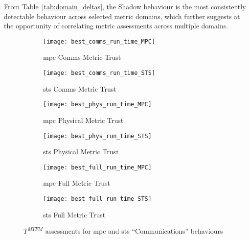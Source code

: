 From Table~\ref{tab:domain_deltas}, the Shadow behaviour is the most consistently detectable behaviour across selected metric domains, which further suggests at the opportunity of correlating metric assessments across multiple domains.




\begin{figure}
	\begin{subfigure}[b]{0.5\textwidth}
	  \centering
	  \texttt{[image: best\_comms\_run\_time\_MPC]}
	  \caption{\gls{mpc} Comms Metric Trust }
	  \label{fig:comms_time_mpc}
	\end{subfigure}
	\begin{subfigure}[b]{0.5\textwidth}
		\centering
		\texttt{[image: best\_comms\_run\_time\_STS]}
		\caption{\gls{sts} Comms Metric Trust }
		\label{fig:comms_time_sts}
	\end{subfigure}
	
	\begin{subfigure}[b]{0.5\textwidth}
	  \centering
	  \texttt{[image: best\_phys\_run\_time\_MPC]}
	  \caption{\gls{mpc} Physical Metric Trust }
	  \label{fig:phys_time_mpc}
	\end{subfigure}
	\begin{subfigure}[b]{0.5\textwidth}
		\centering
		\texttt{[image: best\_phys\_run\_time\_STS]}
		\caption{\gls{sts} Physical Metric Trust }
		\label{fig:phys_time_sts}
	\end{subfigure}
	
	\begin{subfigure}[b]{0.5\textwidth}
	  \centering
	  \texttt{[image: best\_full\_run\_time\_MPC]}
	  \caption{\gls{mpc} Full Metric Trust }
	  \label{fig:full_time_mpc}
	\end{subfigure}
	\begin{subfigure}[b]{0.5\textwidth}
	  \centering
	  \texttt{[image: best\_full\_run\_time\_STS]}
	  \caption{\gls{sts} Full Metric Trust }
	  \label{fig:full_time_sts}
	\end{subfigure}
	\caption{$T^{MTFM}$ assessments for \gls{mpc} and \gls{sts} ``Communications'' behaviours}
	\label{fig:trust_mpc_sts}
\end{figure}


